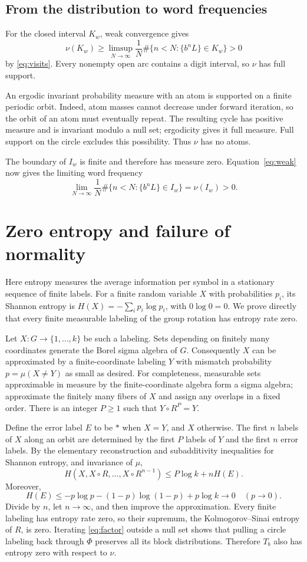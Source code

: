 \documentclass[11pt]{article}
\begin{document}
\subsection*{From the distribution to word frequencies}

For the closed interval $K_w$, weak convergence gives
\[
\nu(K_w)\ge\limsup_{N\to\infty}\frac1N
\#\{n<N:\{b^nL\}\in K_w\}>0
\]
by \eqref{eq:visits}. Every nonempty open arc contains a digit interval,
so $\nu$ has full support.

An ergodic invariant probability measure with an atom is supported on a
finite periodic orbit. Indeed, atom masses cannot decrease under forward
iteration, so the orbit of an atom must eventually repeat. The resulting
cycle has positive measure and is invariant modulo a null set;
ergodicity gives it full measure. Full support on the circle excludes
this possibility. Thus $\nu$ has no atoms.

The boundary of $I_w$ is finite and therefore has measure zero.
Equation~\eqref{eq:weak} now gives the limiting word frequency
\[
\lim_{N\to\infty}\frac1N
\#\{n<N:\{b^nL\}\in I_w\}=\nu(I_w)>0.
\]

\section{Zero entropy and failure of normality}

Here entropy measures the average information per symbol in a stationary
sequence of finite labels. For a finite random variable $X$ with
probabilities $p_i$, its Shannon entropy is
$H(X)=-\sum_i p_i\log p_i$, with $0\log0=0$.
We prove directly that every finite measurable labeling of the group
rotation has entropy rate zero.

Let $X:G\to\{1,\ldots,k\}$ be such a labeling. Sets depending on
finitely many coordinates generate the Borel sigma algebra of $G$.
Consequently $X$ can be approximated by a finite-coordinate labeling
$Y$ with mismatch probability $p=\mu(X\ne Y)$ as small as desired.
For completeness, measurable sets approximable in measure by the
finite-coordinate algebra form a sigma algebra; approximate the finitely
many fibers of $X$ and assign any overlaps in a fixed order.
There is an integer $P\ge1$ such that $Y\circ R^P=Y$.

Define the error label $E$ to be $*$ when $X=Y$, and $X$ otherwise.
The first $n$ labels of $X$ along an orbit are determined by the first
$P$ labels of $Y$ and the first $n$ error labels. By the elementary
reconstruction and subadditivity inequalities for Shannon entropy,
and invariance of $\mu$,
\[
H(X,X\circ R,\ldots,X\circ R^{n-1})
\le P\log k+nH(E).
\]
Moreover,
\[
H(E)\le -p\log p-(1-p)\log(1-p)+p\log k\longrightarrow0
\quad(p\to0).
\]
Divide by $n$, let $n\to\infty$, and then improve the approximation.
Every finite labeling has entropy rate zero, so their supremum, the
Kolmogorov--Sinai entropy of $R$, is zero. Iterating
\eqref{eq:factor} outside a null set shows that pulling a circle
labeling back through $\Phi$ preserves all its block distributions.
Therefore $T_b$ also has entropy zero with respect to $\nu$.
\end{document}
